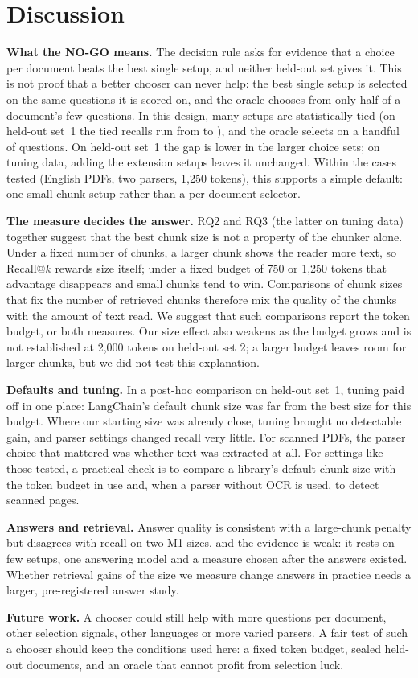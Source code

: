 \section{Discussion}\label{sec:discussion}

\textbf{What the NO-GO means.} The decision rule asks for evidence that a
choice per document beats the best single setup, and neither held-out set
gives it. This is not proof that a better chooser can never help: the best
single setup is selected on the same questions it is scored on, and the
oracle chooses from only half of a document's few questions. In this
design, many setups are statistically tied (on held-out set~1 the tied recalls
run from \RQoneTiedLowestRecall{} to \RQoneBestRecall{}), and the oracle selects
on a handful of questions. On held-out set~1 the gap is lower in the larger
choice sets; on tuning data, adding the extension setups leaves it unchanged. Within the cases tested (English PDFs, two
parsers, 1,250 tokens), this supports a simple default: one small-chunk setup
rather than a per-document selector.

\textbf{The measure decides the answer.} RQ2 and RQ3 (the latter on tuning data) together suggest that the best chunk size is not a property of the chunker alone. Under a fixed number
of chunks, a larger chunk shows the reader more text, so Recall@$k$ rewards
size itself; under a fixed budget of 750 or 1,250 tokens that advantage disappears and
small chunks tend to win. Comparisons of chunk sizes that fix the number of
retrieved chunks therefore mix the quality of the chunks with the amount of
text read. We suggest that such comparisons report the token budget, or both
measures. Our size effect also weakens as the budget grows and is not
established at 2,000 tokens on held-out set 2; a larger budget leaves room
for larger chunks, but we did not test this explanation.

\textbf{Defaults and tuning.} In a post-hoc comparison on held-out set~1, tuning paid off in one
place: LangChain's default chunk size was far from the best size for this budget. Where our
starting size was already close, tuning brought no detectable gain, and
parser settings changed recall very little. For scanned PDFs, the parser
choice that mattered was whether text was extracted at all. For settings like those tested, a
practical check is to compare a library's default chunk size with the token
budget in use and, when a parser without OCR is used, to detect scanned pages.

\textbf{Answers and retrieval.} Answer quality is consistent with a large-chunk
penalty but disagrees with recall on two M1 sizes, and the evidence is weak: it rests on few setups, one
answering model and a measure chosen after the answers existed. Whether
retrieval gains of the size we measure change answers in practice needs a
larger, pre-registered answer study.

\textbf{Future work.} A chooser could still help with more questions per
document, other selection signals, other languages or more varied parsers. A
fair test of such a chooser should keep the conditions used here: a fixed
token budget, sealed held-out documents, and an oracle that cannot profit from
selection luck.
